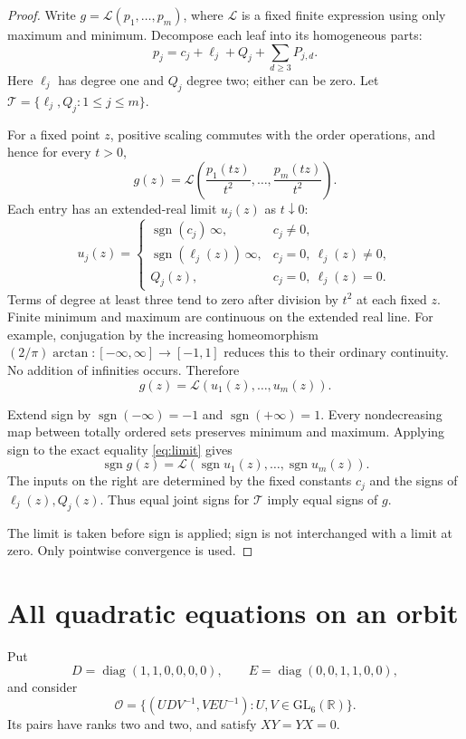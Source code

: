 \documentclass[11pt]{article}
\newcommand{\R}{\mathbb R}
\newcommand{\GL}{\mathrm{GL}_6(\R)}
\newcommand{\sgn}{\operatorname{sgn}}
\newcommand{\diag}{\operatorname{diag}}
\begin{document}
\begin{proof}
Write \(g=\mathcal L(p_1,\ldots,p_m)\), where \(\mathcal L\) is a
fixed finite expression using only maximum and minimum. Decompose
each leaf into its homogeneous parts:
\[
 p_j=c_j+\ell_j+Q_j+\sum_{d\ge3}P_{j,d}.
\]
Here \(\ell_j\) has degree one and \(Q_j\) degree two; either can
be zero. Let \(\mathcal T=\{\ell_j,Q_j:1\le j\le m\}\).

For a fixed point \(z\), positive scaling commutes with the order
operations, and hence for every \(t>0\),
\[
 g(z)=\mathcal L\left(\frac{p_1(tz)}{t^2},\ldots,
                    \frac{p_m(tz)}{t^2}\right).
\]
Each entry has an extended-real limit \(u_j(z)\) as \(t\downarrow0\):
\[
 u_j(z)=
 \begin{cases}
 \sgn(c_j)\,\infty,&c_j\ne0,\\
 \sgn(\ell_j(z))\,\infty,&c_j=0,\ \ell_j(z)\ne0,\\
 Q_j(z),&c_j=0,\ \ell_j(z)=0.
 \end{cases}
\]
Terms of degree at least three tend to zero after division by \(t^2\)
at each fixed \(z\). Finite minimum and maximum are continuous on
the extended real line. For example, conjugation by the increasing
homeomorphism \((2/\pi)\arctan:[-\infty,\infty]\to[-1,1]\)
reduces this to their ordinary continuity. No addition of infinities
occurs. Therefore
\begin{equation}\label{eq:limit}
 g(z)=\mathcal L(u_1(z),\ldots,u_m(z)).
\end{equation}

Extend sign by \(\sgn(-\infty)=-1\) and \(\sgn(+\infty)=1\).
Every nondecreasing map between totally ordered sets preserves
minimum and maximum. Applying sign to the exact equality
\eqref{eq:limit} gives
\[
 \sgn g(z)=\mathcal L(\sgn u_1(z),\ldots,\sgn u_m(z)).
\]
The inputs on the right are determined by the fixed constants \(c_j\)
and the signs of \(\ell_j(z),Q_j(z)\). Thus equal joint signs for
\(\mathcal T\) imply equal signs of \(g\).

The limit is taken before sign is applied; sign is not interchanged
with a limit at zero. Only pointwise convergence is used.
\end{proof}

\section{All quadratic equations on an orbit}

Put
\[
 D=\diag(1,1,0,0,0,0),\qquad
 E=\diag(0,0,1,1,0,0),
\]
and consider
\[
 \mathcal O=\{(UDV^{-1},VEU^{-1}):U,V\in\GL\}.
\]
Its pairs have ranks two and two, and satisfy \(XY=YX=0\).
\end{document}
